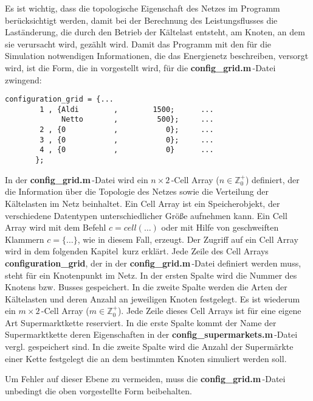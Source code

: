 Es ist wichtig, dass die topologische Eigenschaft des Netzes im Programm berücksichtigt werden, damit bei der
Berechnung des Leistungsflusses die Laständerung, die durch den Betrieb der Kältelast entsteht, am Knoten, an dem sie
verursacht wird, gezählt wird. Damit das Programm mit den für die Simulation notwendigen Informationen,
die das Energienetz beschreiben, versorgt wird, ist die Form, die in  vorgestellt wird, für die
\textbf{config\_grid.m$\,$}-Datei zwingend:

\begin{lstlisting}[float=h,caption={config\_grid.m},label={cgrid}]
%%	Bus,  Supermarkets,	  Number of Supermarkets
configuration_grid = {...
        1 , {Aldi	     ,	      1500;	     ...
             Netto	     ,	       500};	 ...
        2 , {0	         ,           0};	 ...
        3 , {0	         ,           0};	 ...
        4 , {0	         ,           0}	     ...
       };
\end{lstlisting}

In der \textbf{config\_grid.m}$\,$-Datei wird  ein $n\times2\,$-Cell Array ($n\in \mathbb{Z}^+_0$) definiert, der die
Information über die Topologie des Netzes sowie die Verteilung der Kältelasten im Netz beinhaltet. Ein Cell Array ist ein
Speicherobjekt, der verschiedene Datentypen unterschiedlicher Größe aufnehmen kann\cite[Teil 2, Seite 15]{MATLAB-Buch}.  Ein
Cell Array wird mit dem Befehl $c=cell(\ldots)$ oder mit Hilfe von geschweiften Klammern $c=\{\ldots\}$, wie in diesem Fall,
erzeugt. Der Zugriff auf ein Cell Array wird in dem folgenden Kapitel$\,$ kurz
erklärt. Jede Zeile des Cell Arrays \textbf{configuration\_grid}, der in der
\textbf{config\_grid.m}$\,$-Datei definiert werden muss, steht für ein Knotenpunkt im Netz. In der ersten Spalte wird die
Nummer des Knotens bzw. Busses gespeichert. In die zweite Spalte werden die Arten der Kältelasten und deren Anzahl an
jeweiligen Knoten festgelegt. Es ist wiederum ein $m\times2\,$-Cell Array ($m\in \mathbb{Z}^+_0$). Jede Zeile dieses Cell
Arrays ist für eine eigene Art Supermarktkette reserviert. In die erste Spalte kommt der Name der Supermarktkette deren
Eigenschaften in der \textbf{config\_supermarkets.m$\,$}-Datei vergl.   gespeichert sind. In die zweite Spalte
wird die Anzahl der Supermärkte einer Kette festgelegt die an dem bestimmten Knoten simuliert werden soll.

Um Fehler auf dieser Ebene zu vermeiden, muss die \textbf{config\_grid.m}$\,$-Datei unbedingt die oben vorgestellte Form
beibehalten.


